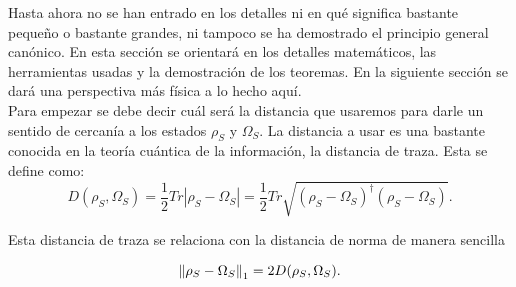 Hasta ahora no se han entrado en los detalles ni en qué significa bastante pequeño o bastante grandes, ni tampoco se ha demostrado el principio general canónico. En esta sección se orientará en los detalles matemáticos, las herramientas usadas y la demostración de los teoremas. En la siguiente sección se dará una perspectiva más física a lo hecho aquí.
\\
Para empezar se debe decir cuál será la distancia que usaremos para darle un sentido de cercanía a los estados $\rho_{S}$ y $\Omega_{S}$. La distancia a usar es una bastante conocida en la teoría cuántica de la información, la distancia de traza. Esta se define como:
\begin{equation}
D(\rho_{S}, \Omega_{S})= \frac{1}{2} Tr |\rho_{S} -\Omega_{S}|=\frac{1}{2}Tr\sqrt{(\rho_{S} -\Omega_{S})^{\dag}(\rho_{S} -\Omega_{S})}.
\end{equation}

Esta distancia de traza se relaciona con la distancia de norma de manera sencilla

\begin{equation}
\norm{\rho_{S}-\Omega_{S}}_{1}=2 D(\rho_{S}, \Omega_{S}).
\end{equation}

